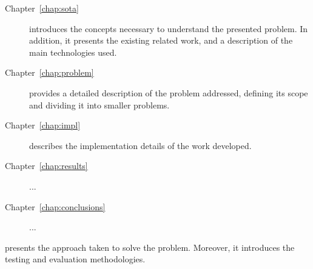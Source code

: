 \begin{description}
  \item[Chapter~\ref{chap:sota}] introduces the concepts necessary to
        understand the presented problem. In addition, it presents
        the existing related work, and a description of the main
        technologies used.
  \item[Chapter~\ref{chap:problem}] provides a detailed description of the
        problem addressed, defining its scope and dividing it into
        smaller problems.
  \item[Chapter~\ref{chap:impl}] describes the implementation details of the
        work developed.
  \item[Chapter~\ref{chap:results}] ...
  \item[Chapter~\ref{chap:conclusions}] ...
\end{description}

presents the approach taken to
        solve the problem. Moreover, it introduces the testing and
        evaluation methodologies.
